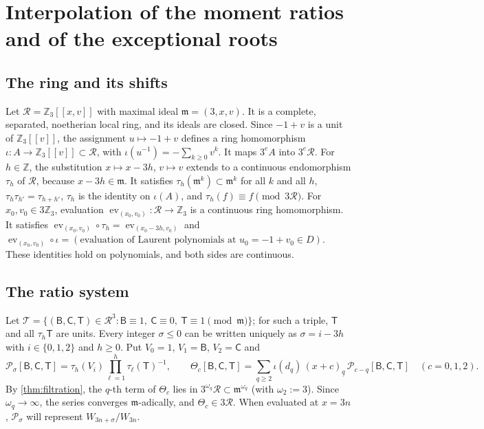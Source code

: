 \documentclass[11pt,reqno]{amsart}
\theoremstyle{definition}
\theoremstyle{remark}
\theoremstyle{plain}
\newcommand{\Z}{\mathbb Z}
\newcommand{\RR}{\mathscr R}
\newcommand{\mm}{\mathfrak m}
\newcommand{\sB}{\mathsf B}
\newcommand{\sC}{\mathsf C}
\newcommand{\sT}{\mathsf T}
\newcommand{\cP}{\mathcal P}
\newcommand{\cT}{\mathcal T}
\newcommand{\ev}{\operatorname{ev}}
\newcommand{\fall}[2]{(#1)_{\underline{#2}}}
\begin{document}
\section{Interpolation of the moment ratios and of the exceptional roots}\label{sec:ratios}

\subsection{The ring and its shifts}
Let $\RR=\Z_3[[x,v]]$ with maximal ideal $\mm=(3,x,v)$. It is a complete, separated, noetherian local ring, and its ideals are closed. Since $-1+v$ is a unit of $\Z_3[[v]]$, the assignment $u\mapsto-1+v$ defines a ring homomorphism $\iota\colon A\to\Z_3[[v]]\subset\RR$, with $\iota(u^{-1})=-\sum_{k\ge0}v^k$. It maps $3^eA$ into $3^e\RR$. For $h\in\Z$, the substitution $x\mapsto x-3h$, $v\mapsto v$ extends to a continuous endomorphism $\tau_h$ of $\RR$, because $x-3h\in\mm$. It satisfies $\tau_h(\mm^k)\subset\mm^k$ for all $k$ and all $h$, $\tau_h\tau_{h'}=\tau_{h+h'}$, $\tau_h$ is the identity on $\iota(A)$, and $\tau_h(f)\equiv f\pmod{3\RR}$. For $x_0,v_0\in3\Z_3$, evaluation $\ev_{(x_0,v_0)}\colon\RR\to\Z_3$ is a continuous ring homomorphism. It satisfies $\ev_{(x_0,v_0)}\circ\tau_h=\ev_{(x_0-3h,v_0)}$ and $\ev_{(x_0,v_0)}\circ\iota=(\text{evaluation of Laurent polynomials at }u_0=-1+v_0\in D)$. These identities hold on polynomials, and both sides are continuous.

\subsection{The ratio system}
Let $\cT=\{(\sB,\sC,\sT)\in\RR^3:\sB\equiv1,\ \sC\equiv0,\ \sT\equiv1\pmod\mm\}$; for such a triple, $\sT$ and all $\tau_h\sT$ are units. Every integer $\sigma\le0$ can be written uniquely as $\sigma=i-3h$ with $i\in\{0,1,2\}$ and $h\ge0$. Put $V_0=1$, $V_1=\sB$, $V_2=\sC$ and
\[
\cP_\sigma[\sB,\sC,\sT]=\tau_h(V_i)\prod_{\ell=1}^h\tau_\ell(\sT)^{-1},\qquad
\Theta_c[\sB,\sC,\sT]=\sum_{q\ge2}\iota(d_q)\,\fall{x+c}q\,\cP_{c-q}[\sB,\sC,\sT]\quad(c=0,1,2).
\]
By \cref{thm:filtration}, the $q$-th term of $\Theta_c$ lies in $3^{\omega_q}\RR\subset\mm^{\omega_q}$ (with $\omega_2:=3$). Since $\omega_q\to\infty$, the series converges $\mm$-adically, and $\Theta_c\in3\RR$. When evaluated at $x=3n$, $\cP_\sigma$ will represent $W_{3n+\sigma}/W_{3n}$.
\end{document}
